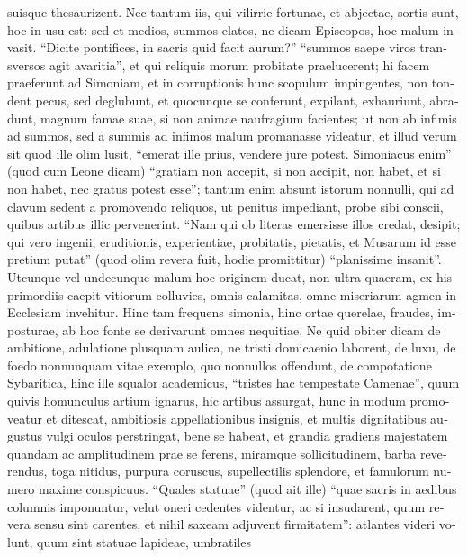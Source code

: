 \begin{latin}
suisque thesaurizent. Nec tantum iis, qui vilirrie fortunae, et abjectae,
sortis sunt, hoc in usu est: sed et medios, summos elatos, ne dicam
Episcopos, hoc malum invasit. \enquote{Dicite pontifices, in
sacris quid facit aurum?} \enquote{summos saepe viros
transversos agit avaritia}, et qui reliquis morum probitate praelucerent; hi
facem praeferunt ad Simoniam, et in corruptionis hunc scopulum impingentes,
non tondent pecus, sed deglubunt, et quocunque se conferunt, expilant,
exhauriunt, abradunt, magnum famae suae, si non animae naufragium facientes;
ut non ab infimis ad summos, sed a summis ad infimos malum promanasse
videatur, et illud verum sit quod ille olim lusit, \enquote{emerat ille prius,
vendere jure potest. Simoniacus enim} (quod cum Leone dicam) \enquote{gratiam non
accepit, si non accipit, non habet, et si non habet, nec gratus potest esse};
tantum enim absunt istorum nonnulli, qui ad clavum sedent a promovendo
reliquos, ut penitus impediant, probe sibi conscii, quibus artibus illic
pervenerint. \enquote{Nam qui ob literas emersisse illos credat,
desipit; qui vero ingenii, eruditionis, experientiae, probitatis, pietatis,
et Musarum id esse pretium putat} (quod olim revera fuit, hodie promittitur)
\enquote{planissime insanit}. Utcunque vel undecunque malum hoc originem ducat, non
ultra quaeram, ex his primordiis caepit vitiorum colluvies, omnis calamitas,
omne miseriarum agmen in Ecclesiam invehitur. Hinc tam frequens simonia, hinc
ortae querelae, fraudes, imposturae, ab hoc fonte se derivarunt omnes
nequitiae. Ne quid obiter dicam de ambitione, adulatione plusquam aulica, ne
tristi domicaenio laborent, de luxu, de foedo nonnunquam vitae exemplo, quo
nonnullos offendunt, de compotatione Sybaritica, \etc{} hinc ille squalor
academicus, \enquote{tristes hac tempestate Camenae}, quum quivis homunculus artium
ignarus, hic artibus assurgat, hunc in modum promoveatur et ditescat,
ambitiosis appellationibus insignis, et multis dignitatibus augustus vulgi
oculos perstringat, bene se habeat, et grandia gradiens majestatem quandam ac
amplitudinem prae se ferens, miramque sollicitudinem, barba reverendus, toga
nitidus, purpura coruscus, supellectilis splendore, et famulorum numero
maxime conspicuus. \enquote{Quales statuae} (quod ait ille)
\enquote{quae sacris in aedibus columnis imponuntur, velut oneri cedentes videntur,
ac si insudarent, quum revera sensu sint carentes, et nihil saxeam adjuvent
firmitatem}: atlantes videri volunt, quum sint statuae lapideae, umbratiles

\end{latin}
